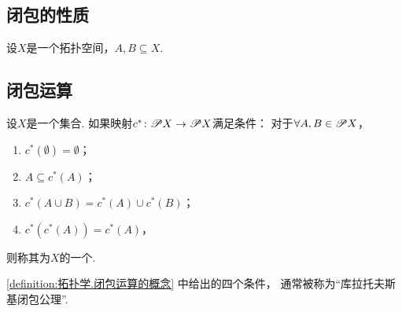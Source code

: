 \subsection{闭包的性质}
\begin{property}\label{theorem:拓扑学.闭包的性质}
设\(X\)是一个拓扑空间，\(A,B \subseteq X\).
\end{property}

\subsection{闭包运算}
\begin{definition}\label{definition:拓扑学.闭包运算的概念}
设\(X\)是一个集合.
如果映射\(c^*\colon \mathscr{P} X \to \mathscr{P} X\)满足条件：
对于\(\forall A,B \in \mathscr{P} X\)，\begin{enumerate}
	\item \(c^*(\emptyset) = \emptyset\)；
	\item \(A \subseteq c^*(A)\)；
	\item \(c^*(A \cup B) = c^*(A) \cup c^*(B)\)；
	\item \(c^*(c^*(A)) = c^*(A)\)，
\end{enumerate}
则称其为\(X\)的一个.
\end{definition}
\cref{definition:拓扑学.闭包运算的概念} 中给出的四个条件，
通常被称为“库拉托夫斯基闭包公理”.
